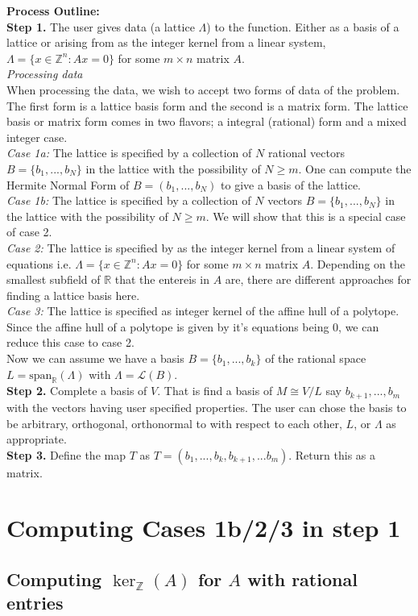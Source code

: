 \documentclass{article}
\newcommand{\nl}{\bigskip \\ } %
\renewcommand{\geq}{\geqslant}
\newcommand{\Z}[0]{\mathbb{Z}}		%
\newcommand{\R}[0]{\mathbb{R}}		%
\newcommand{\La}[0]{\mathcal L}
\theoremstyle{definition}
\theoremstyle{remark}
\begin{document}
\textbf{Process Outline:}\nl
\textbf{Step 1.} The user gives data (a lattice $\Lambda$) to the function.  Either as a basis of a lattice or arising from as the integer kernel from a linear system, $\Lambda = \{x\in \Z^n: Ax=0\}$ for some $m\times n$ matrix $A$. \nl 
\indent \textit{Processing data}\nl 
When processing the data, we wish to accept two forms of data of the problem. The first form is a lattice basis form and the second is a matrix form. The lattice basis or matrix form comes in two flavors; a integral (rational) form and a mixed integer case. \nl 
\indent \textit{Case 1a:} The lattice is specified by a collection of $N$ rational vectors $B= \{b_1,...,b_N\}$ in the lattice with the possibility of $N\geq m$. One can compute the Hermite Normal Form of $B =(b_1,...,b_N)$ to give a basis of the lattice.\nl
\indent \textit{Case 1b:} The lattice is specified by a collection of $N$ vectors $B= \{b_1,...,b_N\}$ in the lattice with the possibility of $N\geq m$. {\color{red} We will show that this is a special case of case 2.}\nl 

\indent \textit{Case 2:} The lattice is specified by as the integer kernel from a linear system of equations i.e. $\Lambda = \{x\in \Z^n: Ax=0\}$ for some $m\times n$ matrix $A$.
Depending on the smallest subfield of $\R$ that the entereis in $A$ are, there are different approaches for finding a lattice basis here. \nl  
{\color{red} \indent \textit{Case 3:} The lattice is specified as integer kernel of the affine hull of a polytope. Since the affine hull of a polytope is given by it's equations being 0, we can reduce this case to case 2. }\nl 

Now we can assume we have a basis $B= \{b_1,...,b_k\}$ of the rational space $L = \text{span}_\R(\Lambda)$ with $\Lambda = \La(B)$. \nl 
\textbf{Step 2.} Complete a basis of $V$. That is find a basis of $M\cong V/L$ say $b_{k+1},..., b_{m}$ with the vectors having user specified properties. The user can chose the basis to be arbitrary, orthogonal, orthonormal to with respect to each other, $L$, or $\Lambda$ as appropriate.  
\nl 
\textbf{Step 3.} Define the map $T$ as $T = (b_1,...,b_k,b_{k+1},...b_m)$. Return this as a matrix.  \nl 




\section{Computing Cases 1b/2/3 in step 1}
\subsection{Computing $\ker_\Z(A)$ for $A$ with rational entries}
\end{document}
